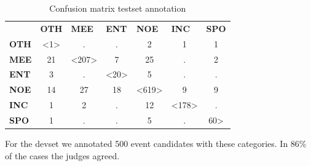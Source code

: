 \documentclass[
10pt, %
a4paper, %
oneside, %
headinclude,footinclude, %
BCOR5mm, %
]{scrartcl}
\begin{document}
\begin{table}[h]
\begin{tabular}{lcccccc}
 & \multicolumn{1}{l}{\textbf{OTH}} & \multicolumn{1}{l}{\textbf{MEE}} & \multicolumn{1}{l}{\textbf{ENT}} & \multicolumn{1}{l}{\textbf{NOE}} & \multicolumn{1}{l}{\textbf{INC}} & \multicolumn{1}{l}{\textbf{SPO}} \\ \cline{2-7} 
\multicolumn{1}{l|}{\textbf{OTH}} & \multicolumn{1}{c|}{\textless1\textgreater} & \multicolumn{1}{c|}{.} & \multicolumn{1}{c|}{.} & \multicolumn{1}{c|}{2} & \multicolumn{1}{c|}{1} & \multicolumn{1}{c|}{1} \\ \cline{2-7} 
\multicolumn{1}{l|}{\textbf{MEE}} & \multicolumn{1}{c|}{21} & \multicolumn{1}{c|}{\textless207\textgreater} & \multicolumn{1}{c|}{7} & \multicolumn{1}{c|}{25} & \multicolumn{1}{c|}{.} & \multicolumn{1}{c|}{2} \\ \cline{2-7} 
\multicolumn{1}{l|}{\textbf{ENT}} & \multicolumn{1}{c|}{3} & \multicolumn{1}{c|}{.} & \multicolumn{1}{c|}{\textless20\textgreater} & \multicolumn{1}{c|}{5} & \multicolumn{1}{c|}{.} & \multicolumn{1}{c|}{.} \\ \cline{2-7} 
\multicolumn{1}{l|}{\textbf{NOE}} & \multicolumn{1}{c|}{14} & \multicolumn{1}{c|}{27} & \multicolumn{1}{c|}{18} & \multicolumn{1}{c|}{\textless619\textgreater} & \multicolumn{1}{c|}{9} & \multicolumn{1}{c|}{9} \\ \cline{2-7} 
\multicolumn{1}{l|}{\textbf{INC}} & \multicolumn{1}{c|}{1} & \multicolumn{1}{c|}{2} & \multicolumn{1}{c|}{.} & \multicolumn{1}{c|}{12} & \multicolumn{1}{c|}{\textless178\textgreater} & \multicolumn{1}{c|}{.} \\ \cline{2-7} 
\multicolumn{1}{l|}{\textbf{SPO}} & \multicolumn{1}{c|}{1} & \multicolumn{1}{c|}{.} & \multicolumn{1}{c|}{.} & \multicolumn{1}{c|}{5} & \multicolumn{1}{c|}{.} & \multicolumn{1}{c|}{60\textgreater} \\ \cline{2-7} 
\end{tabular}
\caption[Table caption text]{Confusion matrix testset annotation }
\end{table}

For the devset we annotated 500 event candidates with these categories. In 86\% of the cases the judges agreed.
\end{document}
